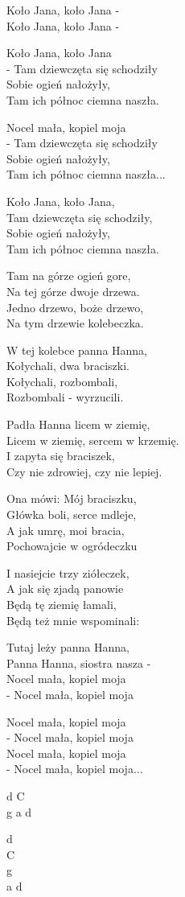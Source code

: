 \begin{text}
    Koło Jana, koło Jana -\\
    Koło Jana, koło Jana -

    Koło Jana, koło Jana\\
    - Tam dziewczęta się schodziły\\
    Sobie ogień nałożyły,\\
    Tam ich północ ciemna naszła.

    Nocel mała, kopiel moja\\
    - Tam dziewczęta się schodziły\\
    Sobie ogień nałożyły,\\
    Tam ich północ ciemna naszła...

    Koło Jana, koło Jana,\\
    Tam dziewczęta się schodziły,\\
    Sobie ogień nałożyły,\\
    Tam ich północ ciemna naszła.

    Tam na górze ogień gore,\\
    Na tej górze dwoje drzewa.\\
    Jedno drzewo, boże drzewo,\\
    Na tym drzewie kolebeczka.

    W tej kolebce panna Hanna,\\
    Kołychali, dwa braciszki.\\
    Kołychali, rozbombali,\\
    Rozbombali - wyrzucili.

    Padła Hanna licem w ziemię,\\
    Licem w ziemię, sercem w krzemię.\\
    I zapyta się braciszek,\\
    Czy nie zdrowiej, czy nie lepiej.

    Ona mówi: Mój braciszku,\\
    Główka boli, serce mdleje,\\
    A jak umrę, moi bracia,\\
    Pochowajcie w ogródeczku

    I nasiejcie trzy ziółeczek,\\
    A jak się zjadą panowie\\
    Będą tę ziemię łamali,\\
    Będą też mnie wspominali:

    Tutaj leży panna Hanna,\\
    Panna Hanna, siostra nasza -\\
    Nocel mała, kopiel moja\\
    - Nocel mała, kopiel moja

    Nocel mała, kopiel moja\\
    - Nocel mała, kopiel moja\\
    Nocel mała, kopiel moja\\
    - Nocel mała, kopiel moja...
\end{text}
\begin{chord}
    d C\\
    g a d

    d\\
    C\\
    g\\
    a d
\end{chord}